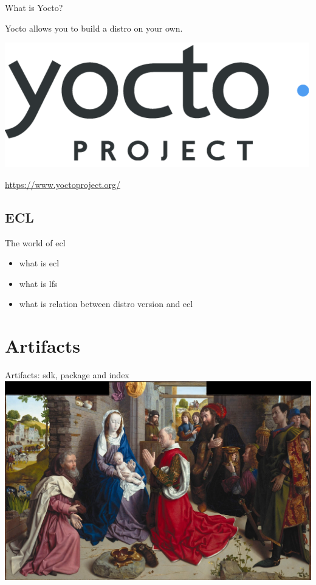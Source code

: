 \documentclass{beamer}
\begin{document}
\begin{frame}{What is Yocto?}
    \begin{block}{}
        Yocto allows you to build a distro on your own.
    \end{block}
    \begin{center}
        \includegraphics[width=0.5\linewidth]{img/Yocto_Logo.png}
    \end{center}
    \begin{block}{}
        \url{https://www.yoctoproject.org/}
    \end{block}
\end{frame}

\subsection{ECL}

\begin{frame}{The world of ecl}
    \begin{itemize}
        \item what is ecl
        \item what is lfs
        \item what is relation between distro version and ecl
    \end{itemize}
\end{frame}

\section{Artifacts}

\begin{frame}{Artifacts: sdk, package and index}
    \centering
    \includegraphics[width=\linewidth]{img/Hugo_van_der_Goes_-_The_Adoration_of_the_Kings.jpg}
\end{frame}
\end{document}

